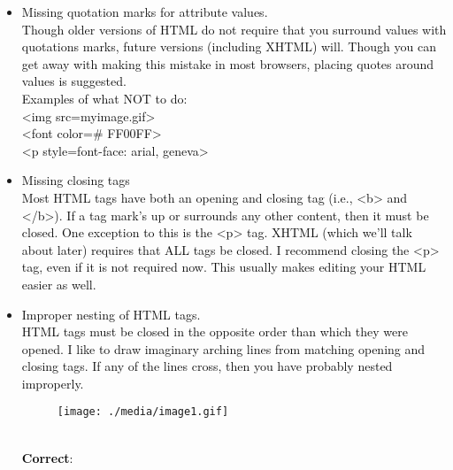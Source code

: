 \documentclass[12pt]{report}
\renewcommand{\_}{\kern-1.5pt\textunderscore\kern-1.5pt}
\begin{document}
\setlength{\parskip}{5.04pt}
\begin{itemize}
	\item \textcolor[HTML]{0D0D0D}{Missing quotation marks for attribute values.\\
Though older versions of HTML do not require that you surround values with quotations marks, future versions (including XHTML) will. Though you can get away with making this mistake in most browsers, placing quotes around values is suggested.\\
Examples of what NOT to do:\\
<img src=myimage.gif>\\
<font color=$\#$ FF00FF>\\
<p style=font-face: arial, geneva>}\par

	\item \textcolor[HTML]{0D0D0D}{Missing closing tags\\
Most HTML tags have both an opening and closing tag (i.e., <b> and </b>). If a tag mark's up or surrounds any other content, then it must be closed. One exception to this is the <p> tag. XHTML (which we'll talk about later) requires that ALL tags be closed. I recommend closing the <p> tag, even if it is not required now. This usually makes editing your HTML easier as well.}\par

\setlength{\parskip}{12.0pt}
	\item \textcolor[HTML]{0D0D0D}{Improper nesting of HTML tags.\\
HTML tags must be closed in the opposite order than which they were opened. I like to draw imaginary arching lines from matching opening and closing tags. If any of the lines cross, then you have probably nested improperly.}\par




\begin{figure}[H]
	\begin{Center}
		\texttt{[image: ./media/image1.gif]}
	\end{Center}
\end{figure}



\\
\textbf{\textcolor[HTML]{0D0D0D}{Correct}}\textcolor[HTML]{0D0D0D}{: \\
}\par



\end{itemize}
\end{document}
